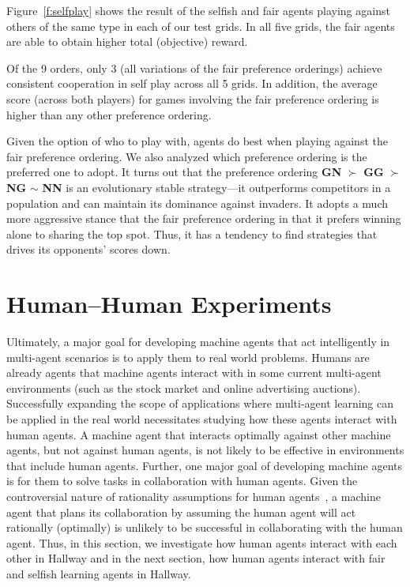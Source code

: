 \documentclass[letterpaper]{article}
\begin{document}
Figure~\ref{f:selfplay} shows the result of the selfish and fair
agents playing against others of the same type in each of our test
grids. In all five grids, the fair agents are able to obtain higher
total (objective) reward.

Of the 9 orders, only 3 (all variations of the fair preference
orderings) achieve consistent cooperation in self play across all 5
grids. In addition, the average score (across both players) for games
involving the fair preference ordering is higher than any other
preference ordering. %

Given the option of who to play with, agents do best when playing
against the fair preference ordering. We also analyzed which
preference ordering is the preferred one to adopt. It turns out that
the preference ordering {\bf GN} $\succ$ {\bf GG} $\succ$ {\bf NG}
$\sim$ {\bf NN} is an evolutionary stable strategy---it outperforms
competitors in a population and can maintain its dominance against
invaders. It adopts a much more aggressive stance that the fair
preference ordering in that it prefers winning alone to sharing the
top spot. Thus, it has a tendency to find strategies that drives its
opponents' scores down.


\section{Human--Human Experiments}

Ultimately, a major goal for developing machine agents that act
intelligently in multi-agent scenarios is to apply them to real world
problems. Humans are already agents that machine agents interact with
in some current multi-agent environments (such as the stock
market and online advertising auctions). Successfully expanding the scope of applications where
multi-agent learning can be applied in the real world necessitates
studying how these agents interact with human agents. A machine agent
that interacts optimally against other machine agents, but not against
human agents, is not likely to be effective in environments that
include human agents. Further, one major goal of developing machine
agents is for them to solve tasks in collaboration with human
agents. Given the controversial nature of rationality assumptions for
human agents~\cite{kahnemanst82}, a machine agent that plans its
collaboration by assuming the human agent will act rationally
(optimally) is unlikely to be successful in collaborating with the
human agent. Thus, in this section, we investigate how human agents
interact with each other in Hallway and in the next section, how human
agents interact with fair and selfish learning agents in Hallway.
\end{document}
